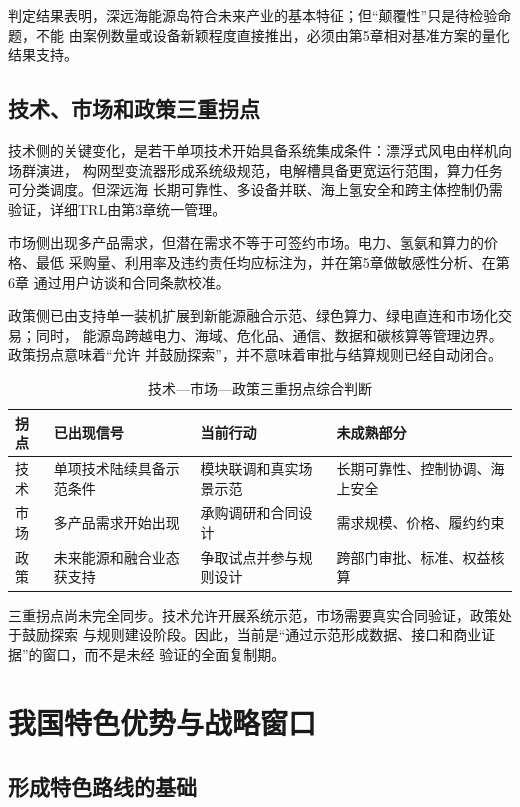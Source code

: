 判定结果表明，深远海能源岛符合未来产业的基本特征；但“颠覆性”只是待检验命题，不能
由案例数量或设备新颖程度直接推出，必须由第5章相对基准方案的量化结果支持。

\subsection{技术、市场和政策三重拐点}

技术侧的关键变化，是若干单项技术开始具备系统集成条件：漂浮式风电由样机向场群演进，
构网型变流器形成系统级规范，电解槽具备更宽运行范围，算力任务可分类调度。但深远海
长期可靠性、多设备并联、海上氢安全和跨主体控制仍需验证，详细TRL由第3章统一管理。

市场侧出现多产品需求，但潜在需求不等于可签约市场。电力、氢氨和算力的价格、最低
采购量、利用率及违约责任均应标注为\assumptiontag，并在第5章做敏感性分析、在第6章
通过用户访谈和合同条款校准。

政策侧已由支持单一装机扩展到新能源融合示范、绿色算力、绿电直连和市场化交易；同时，
能源岛跨越电力、海域、危化品、通信、数据和碳核算等管理边界。政策拐点意味着“允许
并鼓励探索”，并不意味着审批与结算规则已经自动闭合。

\begin{table}[H]
\centering
\caption{技术—市场—政策三重拐点综合判断}
\label{tab:c2-inflections}
\begin{tabularx}{\textwidth}{p{2cm} X X X}
\toprule
拐点 & 已出现信号 & 当前行动 & 未成熟部分\\
\midrule
技术 & 单项技术陆续具备示范条件 & 模块联调和真实场景示范 & 长期可靠性、控制协调、海上安全\\
市场 & 多产品需求开始出现 & 承购调研和合同设计 & 需求规模、价格、履约约束\\
政策 & 未来能源和融合业态获支持 & 争取试点并参与规则设计 & 跨部门审批、标准、权益核算\\
\bottomrule
\end{tabularx}
\end{table}

三重拐点尚未完全同步。技术允许开展系统示范，市场需要真实合同验证，政策处于鼓励探索
与规则建设阶段。因此，当前是“通过示范形成数据、接口和商业证据”的窗口，而不是未经
验证的全面复制期。

\section{我国特色优势与战略窗口}

\subsection{形成特色路线的基础}

